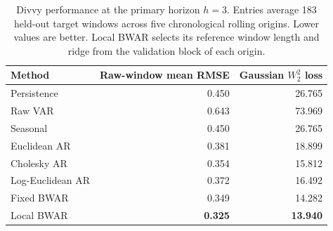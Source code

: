 \begin{table}[H]
\centering
\caption{Divvy performance at the primary horizon \(h=3\). Entries average 183 held-out target windows across five chronological rolling origins. Lower values are better. Local BWAR selects its reference window length and ridge from the validation block of each origin.}
\label{tab:divvy-performance}
\begin{tabular}{lrr}
\toprule
Method & Raw-window mean RMSE & Gaussian \(W_2^2\) loss \\
\midrule
Persistence & 0.450 & 26.765 \\
Raw VAR & 0.643 & 73.969 \\
Seasonal & 0.450 & 26.765 \\
Euclidean AR & 0.381 & 18.899 \\
Cholesky AR & 0.354 & 15.812 \\
Log-Euclidean AR & 0.372 & 16.492 \\
Fixed BWAR & 0.349 & 14.282 \\
Local BWAR & \textbf{0.325} & \textbf{13.940} \\
\bottomrule
\end{tabular}
\end{table}
